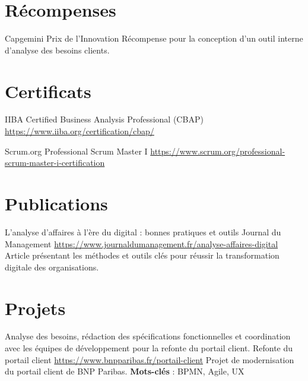 \documentclass[a4paper, serif, 10pt]{moderncv}
\begin{document}
\section{Récompenses}

        {Capgemini}
        {Prix de l'Innovation}
        {}
        {}
        {Récompense pour la conception d'un outil interne d'analyse des besoins clients.}
\section{Certificats}

        {IIBA}
        {Certified Business Analysis Professional (CBAP)}
        {\url{https://www.iiba.org/certification/cbap/}}
        {}
        {}

        {Scrum.org}
        {Professional Scrum Master I}
        {\url{https://www.scrum.org/professional-scrum-master-i-certification}}
        {}
        {}
\section{Publications}

        {L'analyse d'affaires à l'ère du digital : bonnes pratiques et outils}
        {Journal du Management}
        {\url{https://www.journaldumanagement.fr/analyse-affaires-digital}}
        {}
        {Article présentant les méthodes et outils clés pour réussir la transformation digitale des organisations.}
\section{Projets}

        {Analyse des besoins, rédaction des spécifications fonctionnelles et coordination avec les équipes de développement pour la refonte du portail client.
}
        {Refonte du portail client}
        {\url{https://www.bnpparibas.fr/portail-client}}
        {}
        {Projet de modernisation du portail client de BNP Paribas.
\textbf{Mots-clés} : BPMN, Agile, UX}
\end{document}

